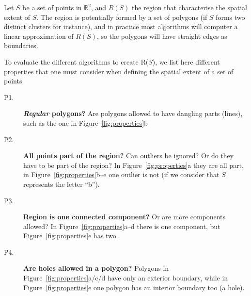 Let $S$ be a set of points in $\mathbb{R}^2$, and $R(S)$ the region that characterise the spatial extent of $S$.
The region is potentially formed by a set of polygons (if $S$ forms two distinct clusters for instance), and in practice most algorithms will computer a linear approximation of $R(S)$, so the polygons will have straight edges as boundaries.

To evaluate the different algorithms to create R($S$), we list here different properties that one must consider when defining the spatial extent of a set of points.
\begin{description}
  \item[P1.] \textbf{\emph{Regular} polygons?} Are polygons allowed to have dangling parts (lines), such as the one in Figure~\ref{fig:properties}b
  \item[P2.] \textbf{All points part of the region?} Can outliers be ignored? Or do they have to be part of the region? In Figure~\ref{fig:properties}a they are all part, in Figure~\ref{fig:properties}b--e one outlier is not (if we consider that $S$ represents the letter ``b'').
  \item[P3.] \textbf{Region is one connected component?} Or are more components allowed? In Figure~\ref{fig:properties}a--d there is one component, but Figure~\ref{fig:properties}e has two.
  \item[P4.] \textbf{Are holes allowed in a polygon?} Polygons in Figure~\ref{fig:properties}a/c/d have only an exterior boundary, while in Figure~\ref{fig:properties}e one polygon has an interior boundary too (a hole).
\end{description}
